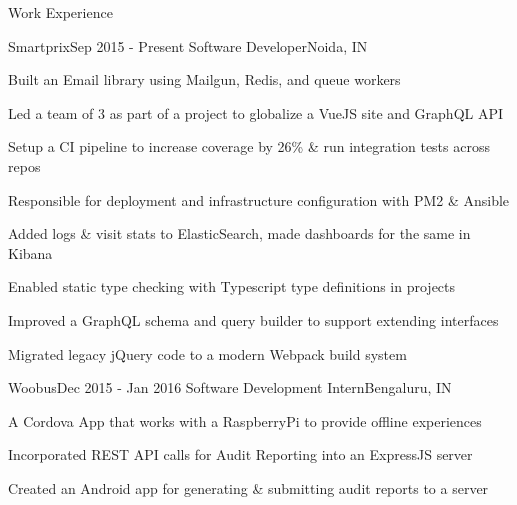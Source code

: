 \documentclass{resume} %
\begin{document}
\begin{rSection}{Work Experience}

    \begin{rSubsection}{Smartprix}{Sep 2015 - Present}
        {Software Developer}{Noida, IN}

        \item Built an Email library using Mailgun, Redis, and queue workers
        \item Led a team of 3 as part of a project to globalize a VueJS site and GraphQL API
        \item Setup a CI pipeline to increase coverage by 26\% \& run integration tests across repos
        \item Responsible for deployment and infrastructure configuration with PM2 \& Ansible 
        \item Added logs \& visit stats to ElasticSearch, made dashboards for the same in Kibana
        \item Enabled static type checking with Typescript type definitions in projects
        \item Improved a GraphQL schema and query builder to support extending interfaces
        \item Migrated legacy jQuery code to a modern Webpack build system
    \end{rSubsection}


    \begin{rSubsection}{Woobus}{Dec 2015 - Jan 2016}
        {Software Development Intern}{Bengaluru, IN}

        \item A Cordova App that works with a RaspberryPi to provide offline experiences
        \item Incorporated REST API calls for Audit Reporting into an ExpressJS server
        \item Created an Android app for generating \& submitting audit reports to a server
    \end{rSubsection}

\end{rSection}


\end{document}
